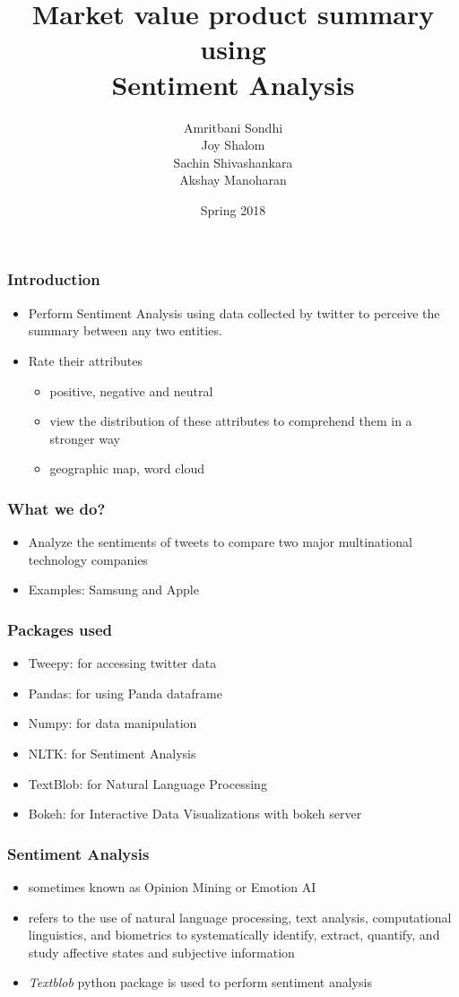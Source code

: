 \documentclass{beamer}
\title{Market value product summary using \\ Sentiment Analysis}
\author{Amritbani Sondhi\\Joy Shalom\\Sachin Shivashankara\\Akshay Manoharan}
\institute{Social Media Mining}
\date{Spring 2018}
\begin{document}
 
\frame{\titlepage}
 
\begin{frame}
\frametitle{Introduction}
\begin{itemize}
\item Perform Sentiment Analysis using data collected by twitter to perceive the summary between any two entities.
\item Rate their attributes 
\begin{itemize}
\item positive, negative and neutral
\item view the distribution of these attributes to comprehend them in a stronger way
\item geographic map, word cloud
\end{itemize}

\end{itemize}
\end{frame}

\begin{frame}
\frametitle{What we do?}
\begin{itemize}
\item Analyze the sentiments of tweets to compare two major multinational technology companies
\item Examples: Samsung and Apple
\end{itemize}
\end{frame}

\begin{frame}
\frametitle{Packages used}
\begin{itemize}
\item Tweepy: for accessing twitter data
\item Pandas: for using Panda dataframe
\item Numpy: for data manipulation
\item NLTK: for Sentiment Analysis
\item TextBlob: for Natural Language Processing
\item Bokeh: for Interactive Data Visualizations with bokeh server
\end{itemize}
\end{frame}

\begin{frame}
\frametitle{Sentiment Analysis}
\begin{itemize}
\item sometimes known as Opinion Mining or Emotion AI
\item refers to the use of natural language processing, text analysis, computational linguistics, and biometrics to systematically identify, extract, quantify, and study affective states and subjective information
\item \textit {Textblob} python package is used to perform sentiment analysis
\end{itemize}
\end{frame}
\end{document}
